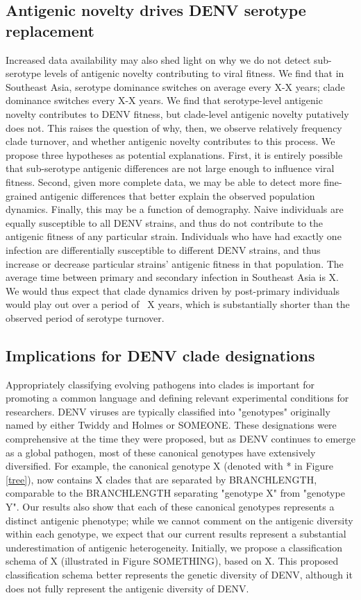 \documentclass[11pt,oneside,letterpaper]{article}
\begin{document}
\subsection*{Antigenic novelty drives DENV serotype replacement}
Increased data availability may also shed light on why we do not detect sub-serotype levels of antigenic novelty contributing to viral fitness.
We find that in Southeast Asia, serotype dominance switches on average every X-X years; clade dominance switches every X-X years.
We find that serotype-level antigenic novelty contributes to DENV fitness, but clade-level antigenic novelty putatively does not.
This raises the question of why, then, we observe relatively frequency clade turnover, and whether antigenic novelty contributes to this process.
We propose three hypotheses as potential explanations.
First, it is entirely possible that sub-serotype antigenic differences are not large enough to influence viral fitness.
Second, given more complete data, we may be able to detect more fine-grained antigenic differences that better explain the observed population dynamics.
Finally, this may be a function of demography.
Naive individuals are equally susceptible to all DENV strains, and thus do not contribute to the antigenic fitness of any particular strain.
Individuals who have had exactly one infection are differentially susceptible to different DENV strains, and thus increase or decrease particular strains' antigenic fitness in that population.
The average time between primary and secondary infection in Southeast Asia is X.
We would thus expect that clade dynamics driven by post-primary individuals would play out over a period of ~X years, which is substantially shorter than the observed period of serotype turnover.

\subsection*{Implications for DENV clade designations}
Appropriately classifying evolving pathogens into clades is important for promoting a common language and defining relevant experimental conditions for researchers.
DENV viruses are typically classified into "genotypes" originally named by either Twiddy and Holmes or SOMEONE.
These designations were comprehensive at the time they were proposed, but as DENV continues to emerge as a global pathogen, most of these canonical genotypes have extensively diversified.
For example, the canonical genotype X (denoted with * in Figure \ref{tree}), now contains X clades that are separated by BRANCHLENGTH, comparable to the BRANCHLENGTH separating "genotype X" from "genotype Y".
Our results also show that each of these canonical genotypes represents a distinct antigenic phenotype; while we cannot comment on the antigenic diversity within each genotype, we expect that our current results represent a substantial underestimation of antigenic heterogeneity.
Initially, we propose a classification schema of X (illustrated in Figure SOMETHING), based on X.
This proposed classification schema better represents the genetic diversity of DENV, although it does not fully represent the antigenic diversity of DENV.
\end{document}

